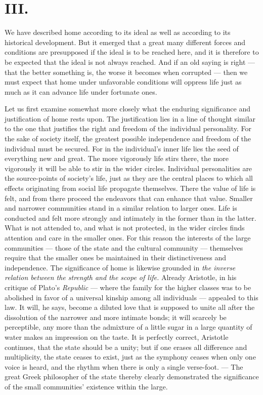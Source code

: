 \documentclass[12pt,a4paper]{article}
\newcommand{\opage}[1]{\marginnote{\footnotesize\textit{[#1]}}}
\begin{document}
\section*{III.}

\noindent \opage{7}We have described home according to its ideal as well as
according to its historical development. But it emerged that a great
many different forces and conditions are presupposed if the ideal is
to be reached here, and it is therefore to be expected that the ideal
is not always reached. And if an old saying is right --- that the
better something is, the worse it becomes when corrupted --- then we
must expect that home under unfavorable conditions will oppress life
just as much as it can advance life under fortunate ones.

Let us first examine somewhat more closely what the enduring
significance and justification of home rests upon. The justification
lies in a line of thought similar to the one that justifies the right
and freedom of the individual personality. For the sake of society
itself, the greatest possible independence and freedom of the
individual must be secured. For in the individual's inner life lies
the seed of everything new and great. The more vigorously life stirs
there, the more vigorously it will be able to stir in the wider
circles. Individual personalities are the source-points of society's
life, just as they are the central places to which all effects
originating from social life propagate themselves. There the value of
life is felt, and from there proceed the endeavors that can enhance
that value. Smaller and narrower communities stand in a similar
relation to larger ones. Life is conducted and felt more strongly and
intimately in the former than in the latter. What is not attended to,
and what is not protected, in the wider circles finds attention and
care in the smaller ones. For this reason the interests of the large
communities --- those of the state and the cultural community --- themselves
require that the smaller ones be maintained in their distinctiveness
and independence. The significance of home is likewise grounded in \emph{the inverse relation between the strength and the scope of life.}
Already Aristotle, in his critique of Plato's \emph{Republic} ---
where the family for the higher classes was to be abolished in favor
of a universal kinship among all individuals --- appealed to this law.
It will, he says, become a diluted love that is supposed to unite
all after the dissolution of the narrower and more intimate bonds;
it will scarcely be perceptible, any more than the admixture of a
little sugar in a large quantity of water makes an impression on the
taste. It is perfectly correct, Aristotle continues, that the state
should be a unity; but if one erases all difference and multiplicity,
the state ceases to exist, just as the symphony ceases when only one
voice is heard, and the rhythm when there is only a single verse-foot.
--- The great Greek philosopher of the state thereby clearly
demonstrated the significance of the small communities' existence
within the large.
\end{document}
